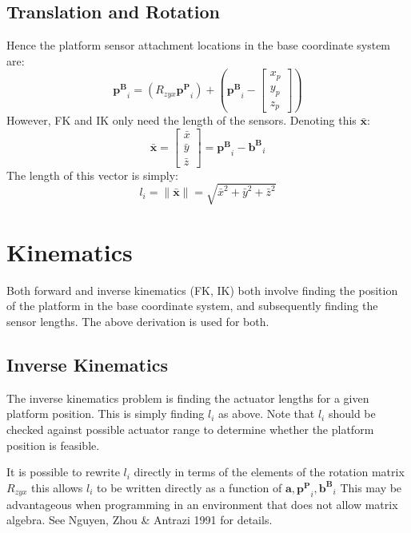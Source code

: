 \documentclass[]{article}
\newcommand\vect[1]{\bm{#1}} %
\begin{document}
\subsection{Translation and Rotation}
\par
	Hence the platform sensor attachment locations in the base coordinate system are:
	$$\vect{p^B}_i = \left(R_{zyx}\vect{p^P}_i\right) + \left(\vect{p^B}_i - \begin{bmatrix}
			x_p \\ 
			y_p \\ 
			z_p
		\end{bmatrix}\right)$$
	However, FK and IK only need the length of the sensors. Denoting this $\vect{\bar{x}}$:
	$$\vect{\bar{x}} = \begin{bmatrix}
	\bar{x} \\ 
	\bar{y} \\ 
	\bar{z}
	\end{bmatrix} = \vect{p^B}_i - \vect{b^B}_i$$ 
	The length of this vector is simply:
	$$l_i = \lVert \vect{\bar{x}} \rVert = \sqrt{ \bar{x}^2 + \bar{y}^2 + \bar{z}^2 }$$
	

	
\section{Kinematics}
\par
	Both forward and inverse kinematics (FK, IK) both involve finding the position of the platform in the base coordinate system, and subsequently finding the sensor lengths. The above derivation is used for both.
	
	\subsection{Inverse Kinematics}
	\par
		The inverse kinematics problem is finding the actuator lengths for a given platform position. This is simply finding $l_i$ as above. Note that $l_i$ should be checked against possible actuator range to determine whether the platform position is feasible.
	\par
		It is possible to rewrite $l_i$ directly in terms of the elements of the rotation matrix $R_{zyx}$ \textemdash this allows $l_i$ to be written directly as a function of $\vect{a},\vect{p^P}_i,\vect{b^B}_i$
		This may be advantageous when programming in an environment that does not allow matrix algebra. See Nguyen, Zhou \& Antrazi 1991 for details.
		
\end{document}
